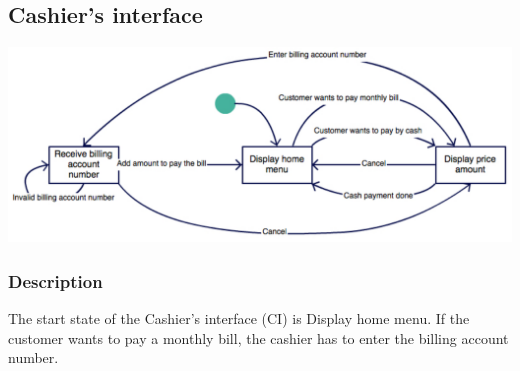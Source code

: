 \documentclass[11pt, a4paper]{article}
\newcommand{\state}[1]{\textsf{#1}}
\begin{document}
\medskip

\subsection{Cashier's interface}

\begin{center}
\includegraphics[width=\textwidth]{CashierInterface_diagram.pdf}
\end{center}

\subsubsection*{Description}

The start state of the Cashier's interface (CI) is \state{Display home menu}.
If the customer wants to pay a monthly bill, the cashier has to enter the billing account number.
\end{document}
